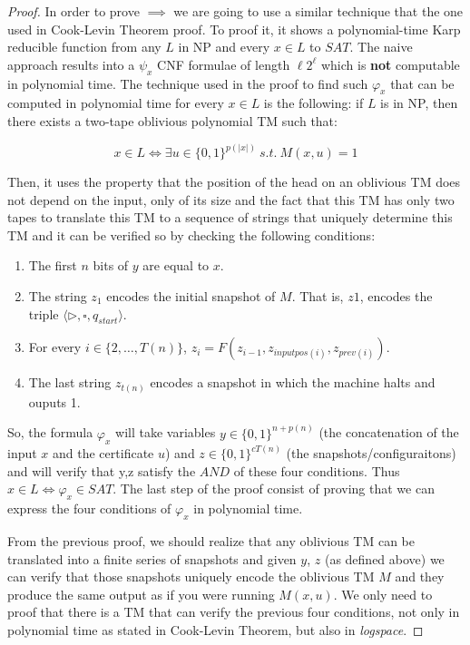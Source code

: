 \documentclass[12pt, a4paper]{article}
\begin{document}
\begin{proof}

  In order to prove $\implies$ we are going to use a similar technique that the one used in Cook-Levin Theorem proof. To proof it, it shows a polynomial-time Karp reducible function from any $L$ in NP and every $x \in L$ to $SAT$. The naive approach results into a $\psi_x$ CNF formulae of length $\ell 2^{\ell}$ which is \textbf{not} computable in polynomial time. The technique used in the proof to find such $\varphi_x$ that can be computed in polynomial time for every $x \in L$ is the following: if $L$ is in NP, then there exists a two-tape oblivious polynomial TM such that:

\begin{equation} \label{eq:1}
x \in L \Leftrightarrow \exists u \in \{ 0, 1 \}^{p(|x|)} \ s.t. \ M(x,u) = 1
\end{equation}

Then, it uses the property that the position of the head on an oblivious TM does not depend on the input, only of its size and the fact that this TM has only two tapes to translate this TM to a sequence of strings that uniquely determine this TM and it can be verified so by checking the following conditions:

\begin{enumerate}
  \item The first $n$ bits of $y$ are equal to $x$.
  \item The string $z_1$ encodes the initial snapshot of $M$. That is, $z1$, encodes the triple $\langle \triangleright, \square, q_{start} \rangle$.
  \item For every $i \in \{ 2, \dots , T(n) \}$, $z_i = F(z_{i-1}, z_{inputpos(i)}, z_{prev(i)})$.
  \item The last string $z_{t(n)}$ encodes a snapshot in which the machine halts and ouputs 1.
\end{enumerate}

  So, the formula $\varphi_x$ will take variables $y \in \{0,1\}^{n+p(n)}$ (the concatenation of the input $x$ and the certificate $u$)  and $z \in \{ 0, 1 \}^{cT(n)}$ (the snapshots/configuraitons) and will verify that y,z satisfy the $AND$ of these four conditions. Thus $x \in L \Leftrightarrow  \varphi_x \in SAT$. The last step of the proof consist of proving that we can express the four conditions of $\varphi_x$ in polynomial time.


  From the previous proof, we should realize that any oblivious TM can be translated into a finite series of snapshots and given $y$, $z$ (as defined above) we can verify that those snapshots uniquely encode the oblivious TM $M$ and they produce the same output as if you were running $M(x,u)$. We only need to proof that there is a TM that can verify the previous four conditions, not only in polynomial time as stated in Cook-Levin Theorem, but also in \textit{logspace}.



\end{proof}
\end{document}
